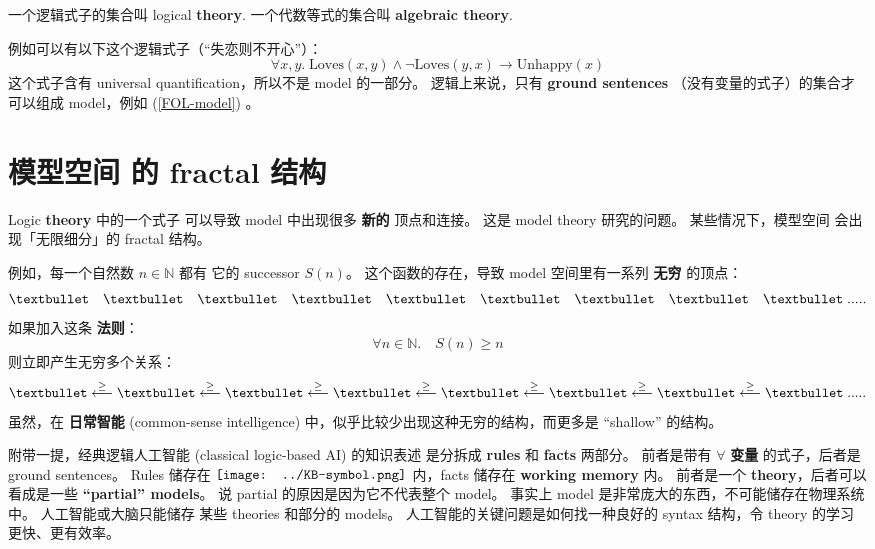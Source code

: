 \documentclass[12pt, orivec]{article}
\newcommand*\KB{\vcenter{\hbox{\texttt{[image: ../KB-symbol.png]}}}}
\begin{document}
一个逻辑式子的集合叫 logical \textbf{theory}.  一个代数等式的集合叫 \textbf{algebraic theory}.

例如可以有以下这个逻辑式子（``失恋则不开心''）：
\begin{equation}
\forall x,y. \; \mbox{Loves}(x,y) \wedge \neg \mbox{Loves}(y,x) \rightarrow \mbox{Unhappy}(x)
\end{equation}
这个式子含有 universal quantification，所以不是 model 的一部分。 逻辑上来说，只有 \textbf{ground sentences} （没有变量的式子）的集合才可以组成 model，例如 (\ref{FOL-model}) 。 

\section{模型空间 的 fractal 结构}

Logic \textbf{theory} 中的一个式子 可以导致 model 中出现很多 \textbf{新的} 顶点和连接。 这是 model theory 研究的问题。  某些情况下，模型空间 会出现「无限细分」的 fractal 结构。 

例如，每一个自然数 $n \in \mathbb{N}$ 都有 它的 successor $S(n)$。 这个函数的存在，导致 model 空间里有一系列 \textbf{无穷} 的顶点：
\begin{equation}
\textbullet \quad \textbullet \quad \textbullet \quad \textbullet \quad \textbullet \quad \textbullet \quad \textbullet \quad \textbullet \quad \textbullet \; .....
\end{equation}
如果加入这条 \textbf{法则}：
\begin{equation}
\forall n \in \mathbb{N}. \quad S(n) \ge n
\end{equation}
则立即产生无穷多个关系：
\begin{equation}
\textbullet \stackrel{\ge}{\longleftarrow} \textbullet \stackrel{\ge}{\longleftarrow} \textbullet \stackrel{\ge}{\longleftarrow} \textbullet \stackrel{\ge}{\longleftarrow} \textbullet \stackrel{\ge}{\longleftarrow} \textbullet \stackrel{\ge}{\longleftarrow} \textbullet \stackrel{\ge}{\longleftarrow} \textbullet \; .....
\end{equation}
虽然，在 \textbf{日常智能} (common-sense intelligence) 中，似乎比较少出现这种无穷的结构，而更多是 ``shallow'' 的结构。 

附带一提，经典逻辑人工智能 (classical logic-based AI) 的知识表述 是分拆成 \textbf{rules} 和 \textbf{facts} 两部分。 前者是带有 $\forall$ \textbf{变量} 的式子，后者是 ground sentences。  Rules 储存在 $\KB$ 内，facts 储存在 \textbf{working memory} 内。 前者是一个 \textbf{theory}，后者可以看成是一些 \textbf{``partial'' models}。  说 partial 的原因是因为它不代表整个 model。  事实上 model 是非常庞大的东西，不可能储存在物理系统中。  人工智能或大脑只能储存 某些 theories 和部分的 models。  人工智能的关键问题是如何找一种良好的 syntax 结构，令 theory 的学习更快、更有效率。 
\end{document}
